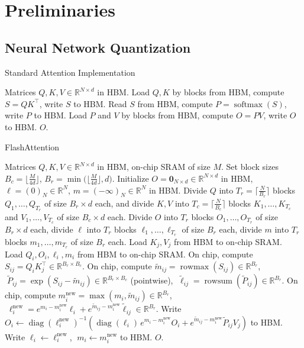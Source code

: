 \documentclass{article}
\newcommand{\rowmax}{\operatorname{rowmax}}
\newcommand{\rowsum}{\operatorname{rowsum}}
\newcommand{\diag}{\operatorname{diag}}
\newcommand{\softmax}{\operatorname{softmax}}
\begin{document}
\section{Preliminaries}
\subsection{Neural Network Quantization}

\begin{algorithm}[H]
  \caption{Standard Attention Implementation}
  \begin{algorithmic}[1]
  \Require Matrices $Q,K,V\in\mathbb{R}^{N\times d}$ in HBM.
  \State Load $Q,K$ by blocks from HBM, compute $S=QK^\top$, write $S$ to HBM.
  \State Read $S$ from HBM, compute $P=\softmax(S)$, write $P$ to HBM.
  \State Load $P$ and $V$ by blocks from HBM, compute $O=PV$, write $O$ to HBM.
  \State \Return $O$.
  \end{algorithmic}
\end{algorithm}

\begin{algorithm}[H]
  \caption{FlashAttention}
  \begin{algorithmic}[1]
  \Require Matrices $Q,K,V\in\mathbb{R}^{N\times d}$ in HBM, on-chip SRAM of size $M$.
  \State Set block sizes $B_c=\Big\lfloor\frac{M}{4d}\Big\rfloor$, $B_r=\min\!\Big(\Big\lfloor\frac{M}{4d}\Big\rfloor,d\Big)$.
  \State Initialize $O=\mathbf{0}_{N\times d}\in\mathbb{R}^{N\times d}$ in HBM, $\ell=(0)_N\in\mathbb{R}^N$, $m=(-\infty)_N\in\mathbb{R}^N$ in HBM.
  \State Divide $Q$ into $T_r=\Big\lceil\frac{N}{B_r}\Big\rceil$ blocks $Q_1,\dots,Q_{T_r}$ of size $B_r\times d$ each, and divide $K,V$ into $T_c=\Big\lceil\frac{N}{B_c}\Big\rceil$ blocks $K_1,\dots,K_{T_c}$ and $V_1,\dots,V_{T_c}$ of size $B_c\times d$ each.
  \State Divide $O$ into $T_r$ blocks $O_1,\dots,O_{T_r}$ of size $B_r\times d$ each, divide $\ell$ into $T_r$ blocks $\ell_1,\dots,\ell_{T_r}$ of size $B_r$ each, divide $m$ into $T_r$ blocks $m_1,\dots,m_{T_r}$ of size $B_r$ each.
    \State Load $K_j, V_j$ from HBM to on-chip SRAM.
      \State Load $Q_i, O_i, \ell_i, m_i$ from HBM to on-chip SRAM.
      \State On chip, compute $S_{ij}=Q_i K_j^\top \in \mathbb{R}^{B_r\times B_c}$.
      \State On chip, compute $\tilde m_{ij}=\rowmax(S_{ij})\in\mathbb{R}^{B_r}$, $\;\tilde P_{ij}=\exp(S_{ij}-\tilde m_{ij})\in\mathbb{R}^{B_r\times B_c}$ (pointwise), $\;\tilde\ell_{ij}=\rowsum(\tilde P_{ij})\in\mathbb{R}^{B_r}$.
      \State On chip, compute $m_i^{\text{new}}=\max(m_i,\tilde m_{ij})\in\mathbb{R}^{B_r}$, $\;\ell_i^{\text{new}}=e^{m_i-m_i^{\text{new}}}\ell_i + e^{\tilde m_{ij}-m_i^{\text{new}}}\tilde\ell_{ij}\in\mathbb{R}^{B_r}$.
      \State Write $O_i \leftarrow \diag(\ell_i^{\text{new}})^{-1}\!\left(\diag(\ell_i)\,e^{m_i-m_i^{\text{new}}} O_i + e^{\tilde m_{ij}-m_i^{\text{new}}}\tilde P_{ij} V_j\right)$ to HBM.
      \State Write $\ell_i \leftarrow \ell_i^{\text{new}}$, $\; m_i \leftarrow m_i^{\text{new}}$ to HBM.
    \EndFor
  \EndFor
  \State \Return $O$.
  \end{algorithmic}
\end{algorithm}
\end{document}
